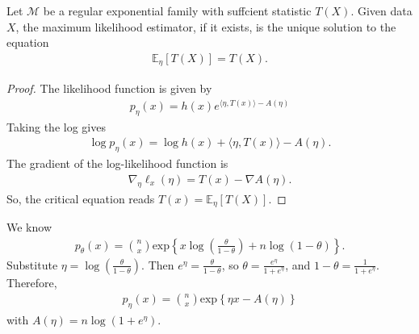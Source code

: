 \begin{cor}\label{mle-discrete-regular-exp}
  Let \( \mathcal{M } \) be a regular exponential family with suffcient statistic \( T(X) \). Given data \( X \), the maximum likelihood estimator, if it exists, is the unique solution to the equation
  \begin{align*}
    \mathbb{E}_\eta[T(X)] = T(X).
  \end{align*}
\end{cor}

\begin{proof}
  The likelihood function is given by
  \begin{align*}
    p_\eta(x) = h(x) e^{\langle \eta, T(x) \rangle - A (\eta)} 
  \end{align*}
  Taking the log gives 
  \begin{align*}
    \log p_\eta(x) = \log h(x) + \langle \eta, T(x) \rangle - A(\eta).
  \end{align*}
  The gradient of the log-likelihood function is
  \begin{align*}
    \nabla_{\eta} \ell_{x}(\eta) = T(x) - \nabla A(\eta).
  \end{align*}
  So, the critical equation reads \( T(x) = \mathbb{E}_\eta[T(X)] \).
\end{proof}

\begin{defi}
  
\end{defi}

\begin{eg}
  We know
  \begin{align*}
    p_\theta(x) = {n \choose x} \mathrm{exp}\left\{ x \log\left( \frac{\theta}{1 - \theta} \right) + n \log(1 - \theta) \right\}.
  \end{align*}
  Substitute \( \eta = \log\left( \frac{\theta}{1 - \theta}\right) \). Then \( e^{\eta} = \frac{\theta}{ 1 - \theta} \), so \( \theta = \frac{e^\eta}{1 + e^{\eta}} \), and \( 1 - \theta = \frac{1}{1 + e^\eta} \). Therefore,
  \begin{align*}
    p_\eta(x) = {n \choose x} \mathrm{exp}\left\{ \eta x - A(\eta) \right\} 
  \end{align*}
 with \( A(\eta) = n \log \left( 1 + e^\eta \right) \).
\end{eg}

